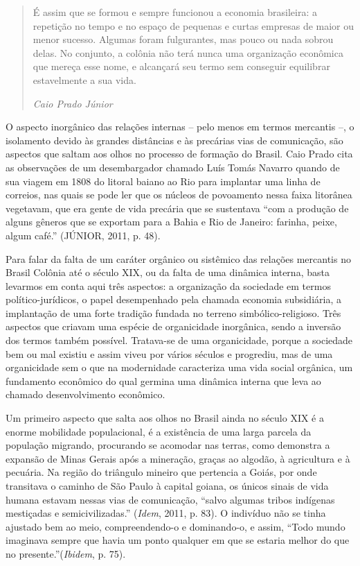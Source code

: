 \begin{quote}
É assim que se formou e sempre funcionou a economia brasileira: a
repetição no tempo e no espaço de pequenas e curtas empresas de maior ou
menor sucesso. Algumas foram fulgurantes, mas pouco ou nada sobrou
delas. No conjunto, a colônia não terá nunca uma organização econômica
que mereça esse nome, e alcançará seu termo sem conseguir equilibrar
estavelmente a sua vida.

\emph{Caio Prado Júnior}
\end{quote}

O aspecto inorgânico das relações internas -- pelo menos em termos
mercantis --, o isolamento devido às grandes distâncias e às precárias
vias de comunicação, são aspectos que saltam aos olhos no processo de
formação do Brasil. Caio Prado cita as observações de um desembargador
chamado Luís Tomás Navarro quando de sua viagem em 1808 do litoral
baiano ao Rio para implantar uma linha de correios, nas quais se pode
ler que os núcleos de povoamento nessa faixa litorânea vegetavam, que
era gente de vida precária que se sustentava ``com a produção de alguns
gêneros que se exportam para a Bahia e Rio de Janeiro: farinha, peixe,
algum café.'' (JÚNIOR, 2011, p. 48).

Para falar da falta de um caráter orgânico ou sistêmico das relações
mercantis no Brasil Colônia até o século XIX, ou da falta de uma
dinâmica interna, basta levarmos em conta aqui três aspectos: a
organização da sociedade em termos político-jurídicos, o papel
desempenhado pela chamada economia subsidiária, a implantação de uma
forte tradição fundada no terreno simbólico-religioso. Três aspectos que
criavam uma espécie de organicidade inorgânica, sendo a inversão dos
termos também possível. Tratava-se de uma organicidade, porque a
sociedade bem ou mal existiu e assim viveu por vários séculos e
progrediu, mas de uma organicidade sem o que na modernidade caracteriza
uma vida social orgânica, um fundamento econômico do qual germina uma
dinâmica interna que leva ao chamado desenvolvimento econômico.

Um primeiro aspecto que salta aos olhos no Brasil ainda no século XIX é
a enorme mobilidade populacional, é a existência de uma larga parcela da
população migrando, procurando se acomodar nas terras, como demonstra a
expansão de Minas Gerais após a mineração, graças ao algodão, à
agricultura e à pecuária. Na região do triângulo mineiro que pertencia a
Goiás, por onde transitava o caminho de São Paulo à capital goiana, os
únicos sinais de vida humana estavam nessas vias de comunicação, ``salvo
algumas tribos indígenas mestiçadas e semicivilizadas.'' (\emph{Idem},
2011, p. 83). O indivíduo não se tinha ajustado bem ao meio,
compreendendo-o e dominando-o, e assim, ``Todo mundo imaginava sempre
que havia um ponto qualquer em que se estaria melhor do que no
presente.''(\emph{Ibidem}, p. 75).

